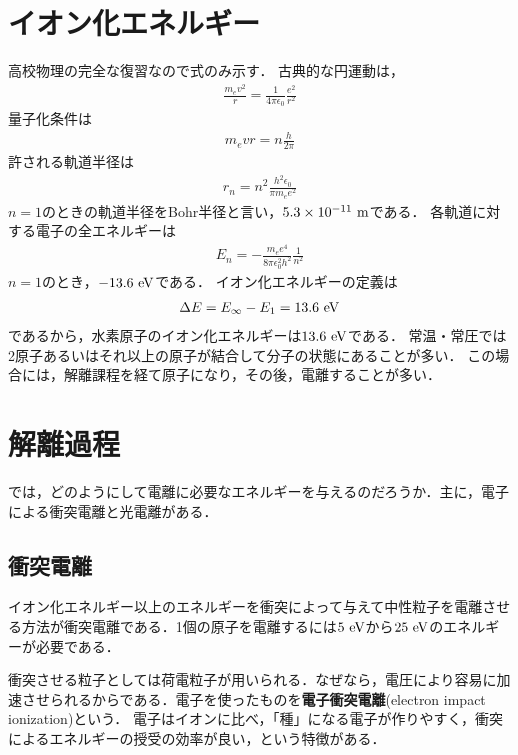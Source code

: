 \documentclass{report}
\begin{document}
  \section{イオン化エネルギー}
    高校物理の完全な復習なので式のみ示す．
    古典的な円運動は，
    \begin{align}
      \frac{m_ev^2}{r} = \frac{1}{4\pi\epsilon_0}\frac{e^2}{r^2}
    \end{align}
    量子化条件は
    \begin{align}
      m_e vr = n\frac{h}{2\pi}
    \end{align}
    許される軌道半径は
    \begin{align}
      r_n = n^2 \frac{h^2\epsilon_0}{\pi m_e e^2}
    \end{align}
    $n = 1$のときの軌道半径をBohr半径と言い，$5.3 \times 10^{-11}\ \mathrm{m}$である．
    各軌道に対する電子の全エネルギーは
    \begin{align}
      E_n = -\frac{m_ee^4}{8\pi\epsilon_0^2h^2}\frac{1}{n^2}
    \end{align}
    $n=1$のとき，$-13.6\ \mathrm{eV}$である．
    イオン化エネルギーの定義は
    \begin{align}
      \Delta E = E_{\infty} - E_1 = 13.6\ \mathrm{eV}
    \end{align}
    であるから，水素原子のイオン化エネルギーは$13.6\ \mathrm{eV}$である．
    常温・常圧では2原子あるいはそれ以上の原子が結合して分子の状態にあることが多い．
    この場合には，解離課程を経て原子になり，その後，電離することが多い．
  \section{解離過程}
    では，どのようにして電離に必要なエネルギーを与えるのだろうか．主に，電子による衝突電離と光電離がある．

    \subsection{衝突電離}
    イオン化エネルギー以上のエネルギーを衝突によって与えて中性粒子を電離させる方法が衝突電離である．1個の原子を電離するには$5\ \mathrm{eV}$から$25\ \r{eV}$のエネルギーが必要である．

    衝突させる粒子としては荷電粒子が用いられる．なぜなら，電圧により容易に加速させられるからである．電子を使ったものを\textbf{電子衝突電離}(electron impact ionization)という．
    電子はイオンに比べ，「種」になる電子が作りやすく，衝突によるエネルギーの授受の効率が良い，という特徴がある．
\end{document}
